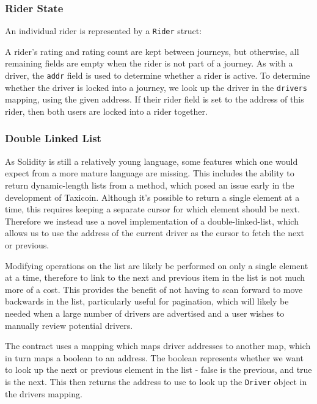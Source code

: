 \subsubsection{Rider State}

An individual rider is represented by a \lstinline{Rider} struct:



A rider's rating and rating count are kept between journeys, but otherwise, all remaining fields are empty when the rider is not part of a journey. As with a driver, the \lstinline{addr} field is used to determine whether a rider is active. To determine whether the driver is locked into a journey, we look up the driver in the \lstinline{drivers} mapping, using the given address. If their rider field is set to the address of this rider, then both users are locked into a rider together.

\subsubsection{Double Linked List}

As Solidity is still a relatively young language, some features which one would expect from a more mature language are missing. This includes the ability to return dynamic-length lists from a method, which posed an issue early in the development of Taxicoin. Although it's possible to return a single element at a time, this requires keeping a separate cursor for which element should be next. Therefore we instead use a novel implementation of a double-linked-list, which allows us to use the address of the current driver as the cursor to fetch the next or previous\footnotemark.


Modifying operations on the list are likely be performed on only a single element at a time, therefore to link to the next and previous item in the list is not much more of a cost. This provides the benefit of not having to scan forward to move backwards in the list, particularly useful for pagination, which will likely be needed when a large number of drivers are advertised and a user wishes to manually review potential drivers.

The contract uses a mapping which maps driver addresses to another map, which in turn maps a boolean to an address. The boolean represents whether we want to look up the next or previous element in the list - false is the previous, and true is the next. This then returns the address to use to look up the \lstinline{Driver} object in the drivers mapping.

